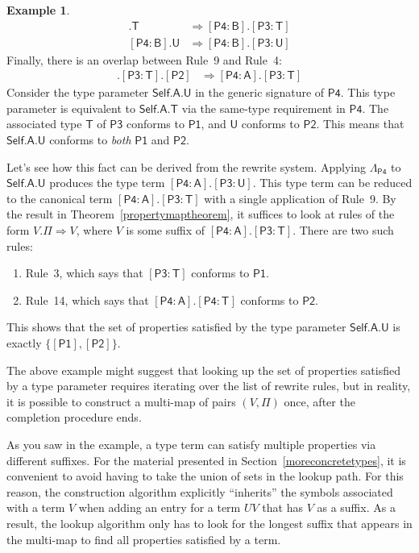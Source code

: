 \documentclass[a4paper,headsepline,bibliography=totoc,toc=flat,fleqn,twoside=semi]{scrbook}
\theoremstyle{definition}
\theoremstyle{definition}
\newtheorem{example}{Example}[chapter]
\theoremstyle{definition}
\newcommand{\namesym}[1]{\mathsf{#1}}
\newcommand{\genericparam}[1]{\bm{\mathsf{#1}}}
\newcommand{\proto}[1]{\bm{\mathsf{#1}}}
\newcommand{\protosym}[1]{[\proto{#1}]}
\newcommand{\assocsym}[2]{[\proto{#1}\colon\namesym{#2}]}
\begin{document}
\begin{example}
\begin{align}
\assocsym{P4}{B}.\namesym{T}&\Rightarrow\assocsym{P4}{B}.\assocsym{P3}{T}\tag{12}\\
\assocsym{P4}{B}.\namesym{U}&\Rightarrow\assocsym{P4}{B}.\assocsym{P3}{U}\tag{13}
\end{align}
Finally, there is an overlap between Rule~9 and Rule~4:
\begin{align}
\assocsym{P4}{A}.\assocsym{P3}{T}.\protosym{P2}&\Rightarrow\assocsym{P4}{A}.\assocsym{P3}{T}\tag{14}
\end{align}
Consider the type parameter $\genericparam{Self}.\namesym{A}.\namesym{U}$ in the generic signature of $\proto{P4}$. This type parameter is equivalent to $\genericparam{Self}.\namesym{A}.\namesym{T}$ via the same-type requirement in $\proto{P4}$. The associated type $\namesym{T}$ of $\proto{P3}$ conforms to $\proto{P1}$, and $\namesym{U}$ conforms to $\proto{P2}$. This means that $\genericparam{Self}.\namesym{A}.\namesym{U}$ conforms to \emph{both} $\proto{P1}$ and $\proto{P2}$.

Let's see how this fact can be derived from the rewrite system. Applying $\Lambda_{\proto{P4}}$ to $\genericparam{Self}.\namesym{A}.\namesym{U}$ produces the type term $\assocsym{P4}{A}.\assocsym{P3}{U}$. This type term can be reduced to the canonical term $\assocsym{P4}{A}.\assocsym{P3}{T}$ with a single application of Rule~9. By the result in Theorem~\ref{propertymaptheorem}, it suffices to look at rules of the form $V.\Pi\Rightarrow V$, where $V$ is some suffix of $\assocsym{P4}{A}.\assocsym{P3}{T}$. There are two such rules:
\begin{enumerate}
\item Rule~3, which says that $\assocsym{P3}{T}$ conforms to $\proto{P1}$.
\item Rule~14, which says that $\assocsym{P4}{A}.\assocsym{P4}{T}$ conforms to $\proto{P2}$.
\end{enumerate}
This shows that the set of properties satisfied by the type parameter $\genericparam{Self}.\namesym{A}.\namesym{U}$ is exactly $\{\protosym{P1},\protosym{P2}\}$.
\end{example}
The above example might suggest that looking up the set of properties satisfied by a type parameter requires iterating over the list of rewrite rules, but in reality, it is possible to construct a multi-map of pairs $(V, \Pi)$ once, after the completion procedure ends.

As you saw in the example, a type term can satisfy multiple properties via different suffixes. For the material presented in Section~\ref{moreconcretetypes}, it is convenient to avoid having to take the union of sets in the lookup path. For this reason, the construction algorithm explicitly
``inherits'' the symbols associated with a term $V$ when adding an entry for a term $UV$ that has $V$ as a suffix. As a result, the lookup algorithm only has to look for the longest suffix that appears in the multi-map to find all properties satisfied by a term.
\end{document}
